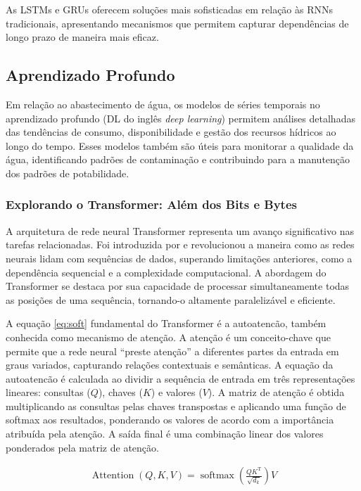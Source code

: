 As LSTMs e GRUs oferecem soluções mais sofisticadas em relação às RNNs tradicionais, apresentando mecanismos que permitem capturar dependências de longo prazo de maneira mais eficaz.

\subsection{Aprendizado Profundo}

Em relação ao abastecimento de água, os modelos de séries temporais no aprendizado profundo (DL do inglês \textit{deep learning}) permitem análises detalhadas das tendências de consumo, disponibilidade e gestão dos recursos hídricos ao longo do tempo. Esses modelos também são úteis para monitorar a qualidade da água, identificando padrões de contaminação e contribuindo para a manutenção dos padrões de potabilidade. 

\subsubsection{Explorando o Transformer: Al\'em dos Bits e Bytes}

A arquitetura de rede neural Transformer representa um avanço significativo nas  tarefas relacionadas. Foi introduzida por \cite{vaswani2017attention} e revolucionou a maneira como as redes neurais lidam com sequências de dados, superando limitações anteriores, como a dependência sequencial e a complexidade computacional. A abordagem do Transformer se destaca por sua capacidade de processar simultaneamente todas as posições de uma sequência, tornando-o altamente paralelizável e eficiente.

A equação \eqref{eq:soft} fundamental do Transformer é a autoatencão, também conhecida como mecanismo de atenção. A atenção é um conceito-chave que permite que a rede neural ``preste atenção'' a diferentes partes da entrada em graus variados, capturando relações contextuais e semânticas. A equação da autoatencão é calculada ao dividir a sequência de entrada em três representações lineares: consultas ($Q$), chaves ($K$) e valores ($V$). A matriz de atenção é obtida multiplicando as consultas pelas chaves transpostas e aplicando uma função de softmax aos resultados, ponderando os valores de acordo com a importância atribuída pela atenção. A saída final é uma combinação linear dos valores ponderados pela matriz de atenção.

\begin{eqnarray}
	\operatorname{Attention}(Q, K, V)=\operatorname{softmax}\left(\frac{Q K^{\mathrm{T}}}{\sqrt{d_k}}\right) V \label{eq:soft}
\end{eqnarray}

